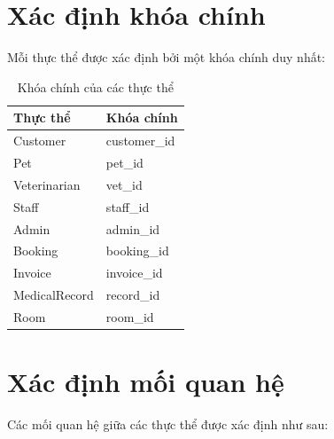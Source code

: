 \section{Xác định khóa chính}

Mỗi thực thể được xác định bởi một khóa chính duy nhất:

\begin{table}[htbp]
    \centering
    \caption{Khóa chính của các thực thể}
    \label{tab:primary_keys}
    \begin{tabular}{|p{3cm}|p{5cm}|}
        \hline
        \textbf{Thực thể} & \textbf{Khóa chính} \\ \hline
        Customer & customer\_id \\ \hline
        Pet & pet\_id \\ \hline
        Veterinarian & vet\_id \\ \hline
        Staff & staff\_id \\ \hline
        Admin & admin\_id \\ \hline
        Booking & booking\_id \\ \hline
        Invoice & invoice\_id \\ \hline
        MedicalRecord & record\_id \\ \hline
        Room & room\_id \\ \hline
    \end{tabular}
\end{table}

\section{Xác định mối quan hệ}

Các mối quan hệ giữa các thực thể được xác định như sau:

